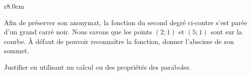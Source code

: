 
\begin{exercice}\label{exosmath-0146}

\begin{wrapfigure}{r}{8.0cm}
   \vspace{-0.5cm}        %
   \centering
   
\end{wrapfigure}
    Afin de préserver son anonymat, la fonction du second degré ci-contre s'est parée d'un grand carré noir. Nous savons que les points \( (2;1)\) et \( (5;1)\) sont sur la courbe. À défaut de pouvoir reconnaître la fonction, donner l'abscisse de son sommet.

    Justifier en utilisant un calcul ou des propriétés des paraboles.


\end{exercice}
